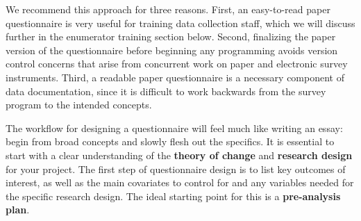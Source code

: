 We recommend this approach for three reasons.
First, an easy-to-read paper questionnaire
is very useful for training data collection staff,
which we will discuss further in the enumerator training section below.
Second, finalizing the paper version of the questionnaire before beginning any programming
avoids version control concerns that arise from concurrent work
on paper and electronic survey instruments.
Third, a readable paper questionnaire is a necessary component of data documentation,
since it is difficult to work backwards from the survey program to the intended concepts.

The workflow for designing a questionnaire will feel much like writing an essay:
begin from broad concepts and slowly flesh out the specifics.
It is essential to start with a clear understanding of the
\textbf{theory of change}
and \textbf{research design}
  for your project.
The first step of questionnaire design is to list key outcomes of interest,
as well as the main covariates to control for and any variables needed for the specific research design.
The ideal starting point for this is a \textbf{pre-analysis plan}.

